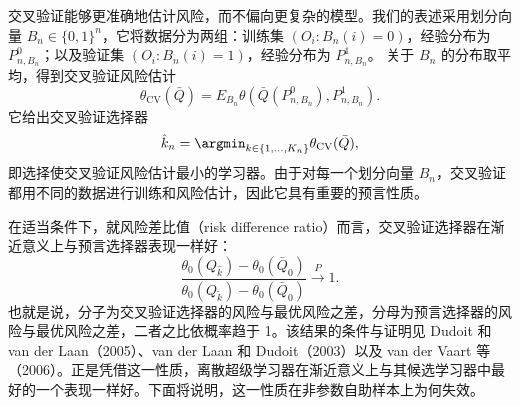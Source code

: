 交叉验证能够更准确地估计风险，而不偏向更复杂的模型。我们的表述采用划分向量 $B_n\in\{0,1\}^n$，它将数据分为两组：训练集
$(O_i:B_n(i)=0)$，经验分布为 $P^0_{n,B_n}$；以及验证集
$(O_i:B_n(i)=1)$，经验分布为 $P^1_{n,B_n}$。
关于 $B_n$ 的分布取平均，得到交叉验证风险估计
\[
 \hat\theta_{\mathrm{CV}}(\bar Q)
 =E_{B_n}\theta(\bar Q(P^0_{n,B_n}),P^1_{n,B_n}).
\]
它给出交叉验证选择器
\[
 \hat k_n=\argmin_{k\in\{1,\ldots,K_n\}}\theta_{\mathrm{CV}}(\bar Q),
\]
即选择使交叉验证风险估计最小的学习器。由于对每一个划分向量 $B_n$，交叉验证都用不同的数据进行训练和风险估计，因此它具有重要的预言性质。

在适当条件下，就风险差比值（risk difference ratio）而言，交叉验证选择器在渐近意义上与预言选择器表现一样好：
\begin{equation}
 \frac{\theta_0(Q_{\hat k})-\theta_0(\bar Q_0)}
 {\theta_0(Q_{\tilde k})-\theta_0(\bar Q_0)}
 \xrightarrow{P}1.
\tag{28.1}
\end{equation}
也就是说，分子为交叉验证选择器的风险与最优风险之差，分母为预言选择器的风险与最优风险之差，二者之比依概率趋于 1。该结果的条件与证明见 Dudoit 和 van der Laan（2005）、van der Laan 和 Dudoit（2003）以及 van der Vaart 等（2006）。正是凭借这一性质，离散超级学习器在渐近意义上与其候选学习器中最好的一个表现一样好。下面将说明，这一性质在非参数自助样本上为何失效。
